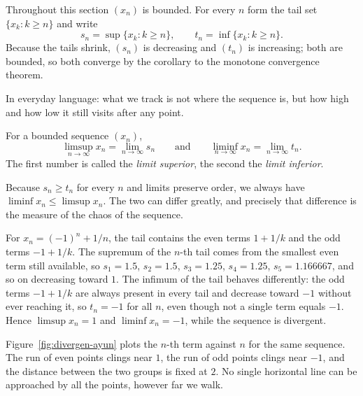 Throughout this section $(x_n)$ is bounded. For every $n$ form the tail set
$\{x_k : k \ge n\}$ and write
\[
s_n=\sup\{x_k : k \ge n\}, \qquad t_n=\inf\{x_k : k \ge n\}.
\]
Because the tails shrink, $(s_n)$ is decreasing and $(t_n)$ is increasing; both are
bounded, so both converge by the corollary to the monotone convergence theorem.

In everyday language: what we track is not where the sequence is, but how high and how
low it still visits after any point.

\begin{definisi}
For a bounded sequence $(x_n)$,
\[
\limsup_{n\to\infty} x_n = \lim_{n\to\infty} s_n
\qquad \text{and} \qquad
\liminf_{n\to\infty} x_n = \lim_{n\to\infty} t_n .
\]
The first number is called the \emph{limit superior}, the second
the \emph{limit inferior}.
\end{definisi}

Because $s_n \ge t_n$ for every $n$ and limits preserve order, we always have
$\liminf x_n \le \limsup x_n$. The two can differ greatly, and precisely that
difference is the measure of the chaos of the sequence.

\begin{contoh}
For $x_n=(-1)^n+1/n$, the tail contains the even terms $1+1/k$ and the odd terms
$-1+1/k$. The supremum of the $n$-th tail comes from the smallest even term still
available, so $s_1=1.5$, $s_2=1.5$, $s_3=1.25$, $s_4=1.25$, $s_5=1.166667$, and so on
decreasing toward $1$. The infimum of the tail behaves differently: the odd terms
$-1+1/k$ are always present in every tail and decrease toward $-1$ without ever
reaching it, so $t_n=-1$ for all $n$, even though not a single term equals $-1$. Hence
$\limsup x_n=1$ and $\liminf x_n=-1$, while the sequence is divergent.
\end{contoh}

Figure~\ref{fig:divergen-ayun} plots the $n$-th term against $n$ for the same sequence.
The run of even points clings near $1$, the run of odd points clings near $-1$, and the
distance between the two groups is fixed at $2$. No single horizontal line can be
approached by all the points, however far we walk.

